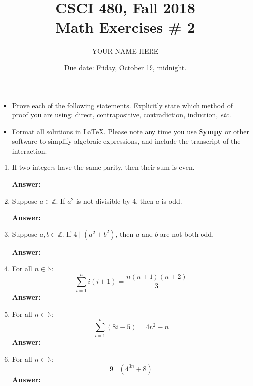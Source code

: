 \documentclass{article}
\title{CSCI 480, Fall 2018\\Math Exercises \# 2}
\author{YOUR NAME HERE}
\date{Due date:  Friday, October 19, midnight.}
\newcommand{\nats}{\ensuremath{\mathbb{N}}}
\begin{document}
\maketitle
\begin{itemize}
  \item
Prove each of the following statements.  Explicitly state which method
of proof you are using: direct, contrapositive, contradiction,
induction, {\em etc.}
\item
Format all solutions in \LaTeX.
Please note any time you use {\bf Sympy} or
other software to simplify algebraic expressions, and include the
transcript of the interaction.
\end{itemize}

\begin{enumerate}
\item If two integers have the same parity, then their sum is even.

{\bf Answer:}
  
\item Suppose $a\in\mathbb{Z}$.  If $a^2$ is not divisible by 4,
  then $a$ is odd.

{\bf Answer:}
  
\item Suppose $a,b\in\mathbb{Z}$.  If $4\mid (a^2+b^2)$, then $a$ and
  $b$ are not both odd.


{\bf Answer:}
  
\item For all $n\in\nats$:
  \[
 \sum_{i=1}^n i(i+1) = \frac{n(n+1)(n+2)}{3}
  \]
{\bf Answer:}
  
\item For all $n\in\nats$:
  \[
 \sum_{i=1}^n (8i-5) = 4n^2 - n
 \]
{\bf Answer:}
  
\item For all $n\in\nats$:
  \[
  9\mid (4^{3n} + 8)
  \]
{\bf Answer:}
  
\end{enumerate}
\end{document}
